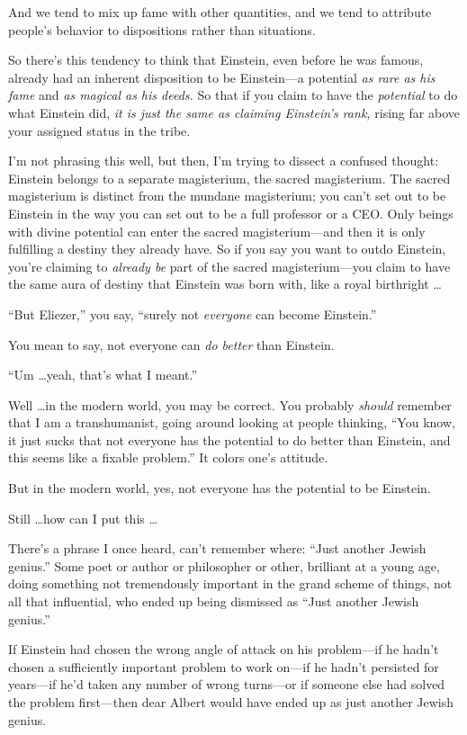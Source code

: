 {
 And we tend to mix up fame with other quantities, and we tend to
attribute people's behavior to dispositions rather than
situations.}

{
 So there's this tendency to think that Einstein,
even before he was famous, already had an inherent disposition to be
Einstein---a potential \textit{as rare as his fame} and \textit{as
magical as his deeds.} So that if you claim to have the
\textit{potential} to do what Einstein did, \textit{it is just the same
as claiming Einstein's rank,} rising far above your
assigned status in the tribe.}

{
 I'm not phrasing this well, but then,
I'm trying to dissect a confused thought: Einstein
belongs to a separate magisterium, the sacred magisterium. The sacred
magisterium is distinct from the mundane magisterium; you
can't set out to be Einstein in the way you can set out
to be a full professor or a CEO. Only beings with divine potential can
enter the sacred magisterium---and then it is only fulfilling a destiny
they already have. So if you say you want to outdo Einstein,
you're claiming to \textit{already be} part of the
sacred magisterium---you claim to have the same aura of destiny that
Einstein was born with, like a royal birthright \ldots}

{
 ``But Eliezer,'' you say,
``surely not \textit{everyone} can become
Einstein.''}

{
 You mean to say, not everyone can \textit{do better} than
Einstein.}

{
 ``Um \ldots yeah, that's what I
meant.''}

{
 Well \ldots in the modern world, you may be correct. You probably
\textit{should} remember that I am a transhumanist, going around
looking at people thinking, ``You know, it just sucks
that not everyone has the potential to do better than Einstein, and
this seems like a fixable problem.'' It colors
one's attitude.}

{
 But in the modern world, yes, not everyone has the potential to be
Einstein.}

{
 Still \ldots how can I put this \ldots}

{
 There's a phrase I once heard,
can't remember where: ``Just another
Jewish genius.'' Some poet or author or philosopher
or other, brilliant at a young age, doing something not tremendously
important in the grand scheme of things, not all that influential, who
ended up being dismissed as ``Just another Jewish
genius.''}

{
 If Einstein had chosen the wrong angle of attack on his
problem---if he hadn't chosen a sufficiently important
problem to work on---if he hadn't persisted for
years---if he'd taken any number of wrong turns---or if
someone else had solved the problem first---then dear Albert would have
ended up as just another Jewish genius.}


